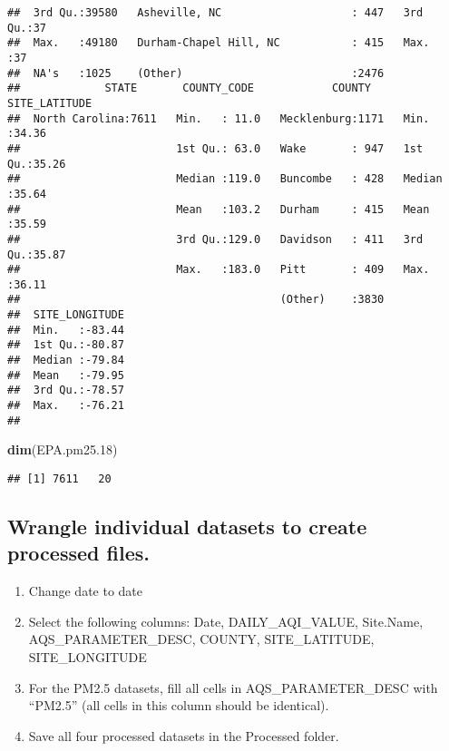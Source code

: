 \documentclass[]{article}
\newenvironment{Shaded}{\begin{snugshade}}{\end{snugshade}}
\newcommand{\KeywordTok}[1]{\textcolor[rgb]{0.13,0.29,0.53}{\textbf{#1}}}
\newcommand{\DecValTok}[1]{\textcolor[rgb]{0.00,0.00,0.81}{#1}}
\newcommand{\NormalTok}[1]{#1}
\providecommand{\tightlist}{%
  \setlength{\itemsep}{0pt}\setlength{\parskip}{0pt}}
\begin{document}
\begin{verbatim}
##  3rd Qu.:39580   Asheville, NC                    : 447   3rd Qu.:37  
##  Max.   :49180   Durham-Chapel Hill, NC           : 415   Max.   :37  
##  NA's   :1025    (Other)                          :2476               
##             STATE       COUNTY_CODE            COUNTY     SITE_LATITUDE  
##  North Carolina:7611   Min.   : 11.0   Mecklenburg:1171   Min.   :34.36  
##                        1st Qu.: 63.0   Wake       : 947   1st Qu.:35.26  
##                        Median :119.0   Buncombe   : 428   Median :35.64  
##                        Mean   :103.2   Durham     : 415   Mean   :35.59  
##                        3rd Qu.:129.0   Davidson   : 411   3rd Qu.:35.87  
##                        Max.   :183.0   Pitt       : 409   Max.   :36.11  
##                                        (Other)    :3830                  
##  SITE_LONGITUDE  
##  Min.   :-83.44  
##  1st Qu.:-80.87  
##  Median :-79.84  
##  Mean   :-79.95  
##  3rd Qu.:-78.57  
##  Max.   :-76.21  
## 
\end{verbatim}

\begin{Shaded}
\begin{Highlighting}[]
\KeywordTok{dim}\NormalTok{(EPA.pm25.}\DecValTok{18}\NormalTok{)}
\end{Highlighting}
\end{Shaded}

\begin{verbatim}
## [1] 7611   20
\end{verbatim}

\subsection{Wrangle individual datasets to create processed
files.}\label{wrangle-individual-datasets-to-create-processed-files.}

\begin{enumerate}
\def\labelenumi{\arabic{enumi}.}
\setcounter{enumi}{2}
\tightlist
\item
  Change date to date
\item
  Select the following columns: Date, DAILY\_AQI\_VALUE, Site.Name,
  AQS\_PARAMETER\_DESC, COUNTY, SITE\_LATITUDE, SITE\_LONGITUDE
\item
  For the PM2.5 datasets, fill all cells in AQS\_PARAMETER\_DESC with
  ``PM2.5'' (all cells in this column should be identical).
\item
  Save all four processed datasets in the Processed folder.
\end{enumerate}
\end{document}

